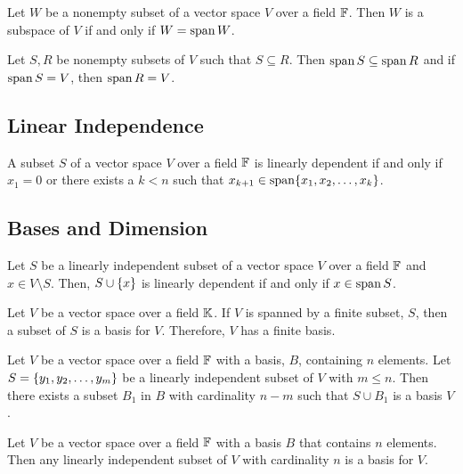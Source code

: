 \begin{proposition}
	Let $W$ be a nonempty subset of a vector space $V$ over a field $\mathbb{F}$.
	Then $W$ is a subspace of $V$ if and only if $W=\operatorname{span} W$.
\end{proposition}

\begin{proposition}
	Let $S,R$ be nonempty subsets of $V$ such that $S\subseteq R$.
	Then $\operatorname{span} S\subseteq \operatorname{span} R$ and if $\operatorname{span} S=V$, then $\operatorname{span} R=V$.
\end{proposition}

\pagebreak

\subsection{Linear Independence}

\begin{thm}
	A subset $S$ of a vector space $V$ over a field $\mathbb{F}$ is linearly dependent if and only if $x_1=0$ or there exists a $k<n$ such that $x_{k+1}\in\operatorname{span} \lbrace x_1,x_2,\ldots,x_k \rbrace$.
\end{thm}

\pagebreak

\subsection{Bases and Dimension}

\begin{thm}
	Let $S$ be a linearly independent subset of a vector space $V$ over a field $\mathbb{F}$ and $x\in V\setminus S$.
	Then, $S\cup\lbrace x \rbrace$ is linearly dependent if and only if $x\in\operatorname{span} S$.
\end{thm}

\begin{thm}
	Let $V$ be a vector space over a field $\mathbb{K}$.
	If $V$ is spanned by a finite subset, $S$, then a subset of $S$ is a basis for $V$.
	Therefore, $V$ has a finite basis.
\end{thm}

\begin{thm}
	Let $V$ be a vector space over a field $\mathbb{F}$ with a basis, $B$, containing $n$ elements.
	Let $S=\lbrace y_1,y_2,\ldots,y_m \rbrace$ be a linearly independent subset of $V$ with $m\leq n$.
	Then there exists a subset $B_1$ in $B$ with cardinality $n-m$ such that $S\cup B_1$ is a basis $V$.
\end{thm}

\begin{corollary}
	Let $V$ be a vector space over a field $\mathbb{F}$ with a basis $B$ that contains $n$ elements.
	Then any linearly independent subset of $V$ with cardinality $n$ is a basis for $V$.
\end{corollary}

